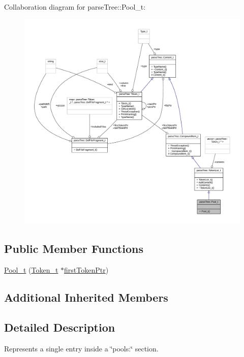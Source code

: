 Collaboration diagram for parse\+Tree\+:\+:Pool\+\_\+t\+:
\nopagebreak
\begin{figure}[H]
\begin{center}
\leavevmode
\includegraphics[width=350pt]{structparse_tree_1_1_pool__t__coll__graph}
\end{center}
\end{figure}
\subsection*{Public Member Functions}
\begin{DoxyCompactItemize}
\item 
\hyperlink{structparse_tree_1_1_pool__t_a3c24456f43f4507fd830cf06a0a459d3}{Pool\+\_\+t} (\hyperlink{structparse_tree_1_1_token__t}{Token\+\_\+t} $\ast$\hyperlink{structparse_tree_1_1_compound_item__t_a587020c943e760cb0152dd8cd31e21ef}{first\+Token\+Ptr})
\end{DoxyCompactItemize}
\subsection*{Additional Inherited Members}


\subsection{Detailed Description}
Represents a single entry inside a \char`\"{}pools\+:\char`\"{} section. 

